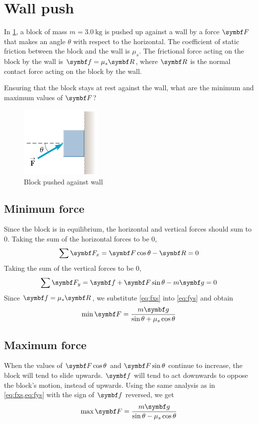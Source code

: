\section{Wall push}
\begin{problem}
  In \cref{fig:wallpush}, a block of mass \(m = \qty{3.0}{\kg}\) is
  pushed up against a wall by a force
  \(\mv{F}\) that makes an angle \(\theta\) with respect to the horizontal.
  The coefficient of static friction between the block and the wall
  is \(\mu_s\).
  The frictional force acting on the block by the wall is \(\mv{f} =
  \mu_s\mv{R}\),
  where \(\mv{R}\) is the normal contact force acting on the block by the wall.

  Ensuring that the block stays at rest against the wall, what are the minimum
  and maximum values of \(\mv{F}\)?
\end{problem}
\begin{figure}
  \centering
  \includegraphics[width=0.35\textwidth]{assets/wallpush.png}
  \caption{Block pushed against wall}
  \label{fig:wallpush}
\end{figure}
\subsection{Minimum force}
Since the block is in equilibrium, the horizontal and vertical forces should
sum to \(0\).
Taking the sum of the horizontal forces to be \(0\),
\begin{equation}
  \sum\mv{F}_x=\mv{F}\cos\theta-\mv{R}= 0
  \label{eq:fxs}
\end{equation}
Taking the sum of the vertical forces to be \(0\),
\begin{equation}
  \sum\mv{F}_y = \mv{f} + \mv{F}\sin\theta - m\mv{g} = 0
  \label{eq:fys}
\end{equation}
Since \(\mv{f} = \mu_s\mv{R}\), we substitute \cref{eq:fxs} into
\cref{eq:fys} and obtain
\begin{equation}
  \min\mv{F} = \f{m\mv{g}}{\sin\theta+\mu_s\cos\theta}
\end{equation}
\subsection{Maximum force}
When the values of \(\mv{F}\cos\theta\) and \(\mv{F}\sin\theta\)
continue to increase, the block will tend to slide upwards.
\(\mv{f}\) will tend to act downwards to oppose the block's motion,
instead of upwards. Using the
same analysis as in
\cref{eq:fxs,eq:fys} with the sign of \(\mv{f}\) reversed, we get
\begin{equation}
  \max\mv{F} = \f{m\mv{g}}{\sin\theta-\mu_s\cos\theta}
\end{equation}